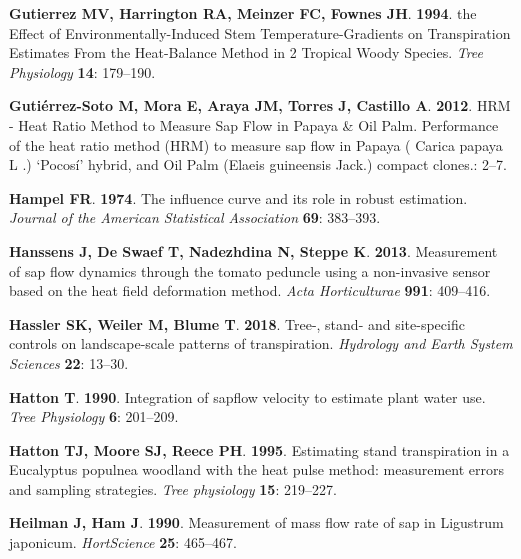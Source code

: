 \documentclass[11pt,twoside]{reedthesis}
\begin{document}
\hypertarget{ref-Gutierrez1994}{}
\textbf{\textnormal{Gutierrez MV}, \textnormal{Harrington RA},
\textnormal{Meinzer FC}, \textnormal{Fownes JH}}. \textbf{1994}. the
Effect of Environmentally-Induced Stem Temperature-Gradients on
Transpiration Estimates From the Heat-Balance Method in 2 Tropical Woody
Species. \emph{Tree Physiology} \textbf{14}: 179--190.

\hypertarget{ref-Gutierrez-Soto2012}{}
\textbf{\textnormal{Gutiérrez-Soto M}, \textnormal{Mora E},
\textnormal{Araya JM}, \textnormal{Torres J}, \textnormal{Castillo A}}.
\textbf{2012}. HRM - Heat Ratio Method to Measure Sap Flow in Papaya \&
Oil Palm. Performance of the heat ratio method (HRM) to measure sap flow
in Papaya ( Carica papaya L .) `Pocosí' hybrid, and Oil Palm (Elaeis
guineensis Jack.) compact clones.: 2--7.

\hypertarget{ref-Hampel1974}{}
\textbf{\textnormal{Hampel FR}}. \textbf{1974}. The influence curve and
its role in robust estimation. \emph{Journal of the American Statistical
Association} \textbf{69}: 383--393.

\hypertarget{ref-Hanssens2013}{}
\textbf{\textnormal{Hanssens J}, \textnormal{De Swaef T},
\textnormal{Nadezhdina N}, \textnormal{Steppe K}}. \textbf{2013}.
Measurement of sap flow dynamics through the tomato peduncle using a
non-invasive sensor based on the heat field deformation method.
\emph{Acta Horticulturae} \textbf{991}: 409--416.

\hypertarget{ref-Hassler2018}{}
\textbf{\textnormal{Hassler SK}, \textnormal{Weiler M},
\textnormal{Blume T}}. \textbf{2018}. Tree-, stand- and site-specific
controls on landscape-scale patterns of transpiration. \emph{Hydrology
and Earth System Sciences} \textbf{22}: 13--30.

\hypertarget{ref-Hatton1990}{}
\textbf{\textnormal{Hatton T}}. \textbf{1990}. Integration of sapflow
velocity to estimate plant water use. \emph{Tree Physiology} \textbf{6}:
201--209.

\hypertarget{ref-Hatton1995}{}
\textbf{\textnormal{Hatton TJ}, \textnormal{Moore SJ}, \textnormal{Reece
PH}}. \textbf{1995}. Estimating stand transpiration in a Eucalyptus
populnea woodland with the heat pulse method: measurement errors and
sampling strategies. \emph{Tree physiology} \textbf{15}: 219--227.

\hypertarget{ref-Heilman1990}{}
\textbf{\textnormal{Heilman J}, \textnormal{Ham J}}. \textbf{1990}.
Measurement of mass flow rate of sap in Ligustrum japonicum.
\emph{HortScience} \textbf{25}: 465--467.
\end{document}
